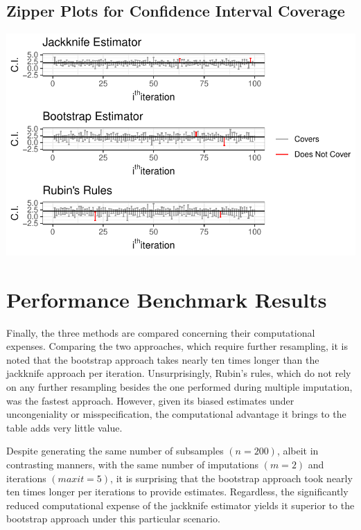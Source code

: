 \documentclass[
  letterpaper,
  DIV=11,
  numbers=noendperiod]{scrreprt}
\begin{document}
\hypertarget{sec-zip}{%
\subsection{Zipper Plots for Confidence Interval
Coverage}\label{sec-zip}}

\includegraphics{./results_files/figure-pdf/unnamed-chunk-5-1.pdf}

\hypertarget{performance-benchmark-results}{%
\section{Performance Benchmark
Results}\label{performance-benchmark-results}}

Finally, the three methods are compared concerning their computational
expenses. Comparing the two approaches, which require further
resampling, it is noted that the bootstrap approach takes nearly ten
times longer than the jackknife approach per iteration. Unsurprisingly,
Rubin's rules, which do not rely on any further resampling besides the
one performed during multiple imputation, was the fastest approach.
However, given its biased estimates under uncongeniality or
misspecification, the computational advantage it brings to the table
adds very little value.

Despite generating the same number of subsamples \((n = 200)\), albeit
in contrasting manners, with the same number of imputations \((m = 2)\)
and iterations \((maxit = 5)\), it is surprising that the bootstrap
approach took nearly ten times longer per iterations to provide
estimates. Regardless, the significantly reduced computational expense
of the jackknife estimator yields it superior to the bootstrap approach
under this particular scenario.
\end{document}
